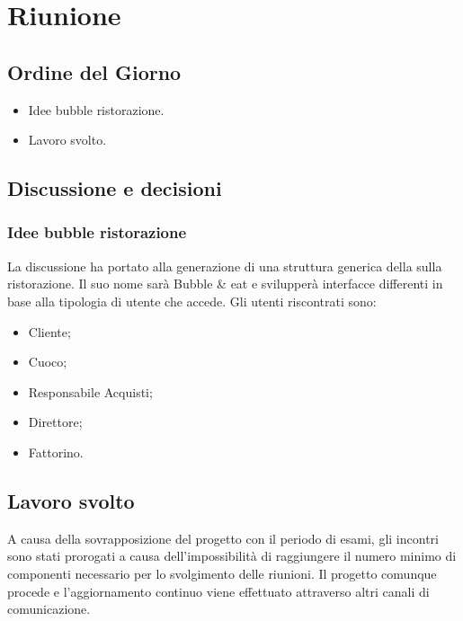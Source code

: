 
\section{Riunione}
\subsection{Ordine del Giorno}
\begin{itemize}
	\item Idee bubble ristorazione.
	\item Lavoro svolto.
\end{itemize}

\subsection{Discussione e decisioni}
\subsubsection{Idee bubble ristorazione}
La discussione ha portato alla generazione di una struttura generica della  sulla ristorazione. Il suo nome sarà Bubble \& eat e svilupperà interfacce differenti in base alla tipologia di utente che accede.
Gli utenti riscontrati sono:
\begin{itemize}
	\item Cliente;
	\item Cuoco;
	\item Responsabile Acquisti;
	\item Direttore;
	\item Fattorino.
\end{itemize}

\subsection{Lavoro svolto}
A causa della sovrapposizione del progetto con il periodo di esami, gli incontri sono stati prorogati a causa dell'impossibilità di raggiungere il numero minimo di componenti necessario per lo svolgimento delle riunioni. Il progetto comunque procede e l'aggiornamento continuo viene effettuato attraverso altri canali di comunicazione.
 

\clearpage

